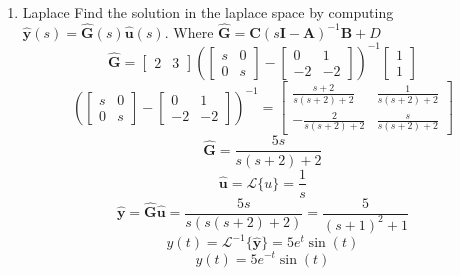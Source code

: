 \documentclass{article}
\begin{document}
\begin{enumerate}[1.]
\item Laplace
Find the solution in the laplace space by computing $\mathbf{\hat{y}}(s) = \mathbf{\hat{G}}(s)\mathbf{\hat{u}}(s)$.
Where $\mathbf{\hat{G}} = \mathbf{C}(s\mathbf{I}-\mathbf{A})^{-1}\mathbf{B} + D$
$$\mathbf{\hat{G}} =
\begin{bmatrix} 2 & 3 \end{bmatrix}
\left(
\begin{bmatrix}
s & 0 \\
0 & s
\end{bmatrix}
-
\begin{bmatrix}
0 & 1 \\
-2 & -2
\end{bmatrix}
\right)
^{-1}
\begin{bmatrix}
1\\
1
\end{bmatrix}
$$
$$
\left(
\begin{bmatrix}
s & 0 \\
0 & s
\end{bmatrix}
-
\begin{bmatrix}
0 & 1 \\
-2 & -2
\end{bmatrix}
\right)
^{-1}
=
\begin{bmatrix}
\frac{s+2}{s (s+2)+2} & \frac{1}{s (s+2)+2} \\
-\frac{2}{s (s+2)+2} & \frac{s}{s (s+2)+2}
\end{bmatrix}
$$
$$\mathbf{\hat{G}} = \frac{5 s}{s (s+2)+2}$$
$$\mathbf{\hat{u}} = \mathcal{L}\{u\} = \frac{1}{s} $$
$$\mathbf{\hat{y}} = \mathbf{\hat{G}}\mathbf{\hat{u}} = \frac{5 s}{s(s (s+2)+2)} = \frac{5}{(s+1)^2 + 1}$$
$$ y(t) = \mathcal{L}^{-1}\{\mathbf{\hat{y}}\} = 5 e^{t} \sin(t) $$
$$ y(t) = 5 e^{-t} \sin(t) $$
\end{enumerate}

\newpage
\end{document}
